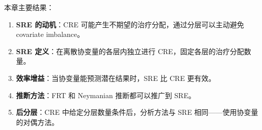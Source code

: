 本章主要结果：

\begin{enumerate}
\item \textbf{SRE 的动机}：CRE 可能产生不期望的治疗分配，通过分层可以主动避免 covariate imbalance。
\item \textbf{SRE 定义}：在离散协变量的各层内独立进行 CRE，固定各层的治疗分配数量。
\item \textbf{效率增益}：当协变量能预测潜在结果时，SRE 比 CRE 更有效。
\item \textbf{推断方法}：FRT 和 Neymanian 推断都可以推广到 SRE。
\item \textbf{后分层}：CRE 中给定分层数量条件后，分析方法与 SRE 相同——使用协变量的对偶方法。
\end{enumerate}

\par{}

\endinput
